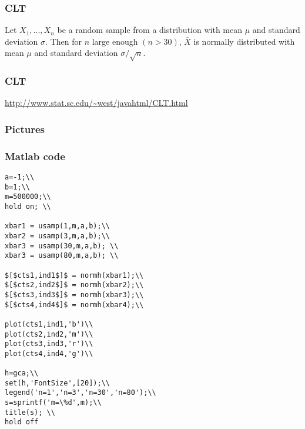 \begin{frame}[fragile]\frametitle{CLT}

\begin{prop}

Let $X_1,...,X_n$ be a random sample from a distribution with 
mean $\mu$ and standard deviation
$\sigma$.  Then for $n$ large enough $(n>30)$, 
$\bar{X}$ is normally
distributed with mean $\mu$ and 
standard deviation $\sigma/\sqrt{n}$.
\end{prop}
\end{frame}

\begin{frame}[fragile]\frametitle{CLT}

\alert{\url{http://www.stat.sc.edu/~west/javahtml/CLT.html}}
\end{frame}

\begin{frame}[fragile]\frametitle{Pictures}


\end{frame}



\begin{frame}[fragile]\frametitle{Matlab code}

{\tiny

\begin{lstlisting}
a=-1;\\
b=1;\\
m=500000;\\
hold on; \\

xbar1 = usamp(1,m,a,b);\\
xbar2 = usamp(3,m,a,b);\\
xbar3 = usamp(30,m,a,b); \\
xbar3 = usamp(80,m,a,b); \\

$[$cts1,ind1$]$ = normh(xbar1);\\
$[$cts2,ind2$]$ = normh(xbar2);\\
$[$cts3,ind3$]$ = normh(xbar3);\\
$[$cts4,ind4$]$ = normh(xbar4);\\

plot(cts1,ind1,'b')\\
plot(cts2,ind2,'m')\\
plot(cts3,ind3,'r')\\
plot(cts4,ind4,'g')\\

h=gca;\\
set(h,'FontSize',[20]);\\
legend('n=1','n=3','n=30','n=80');\\
s=sprintf('m=\%d',m);\\
title(s); \\
hold off


\end{lstlisting}
}
\end{frame}


